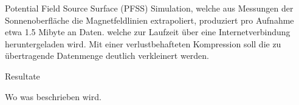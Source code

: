 Potential Field Source Surface (PFSS) Simulation, welche aus Messungen der Sonnenoberfläche die Magnetfeldlinien extrapoliert, produziert pro Aufnahme etwa 1.5 Mibyte an Daten. welche zur Laufzeit über eine Internetverbindung heruntergeladen wird. Mit einer verlustbehafteten Kompression soll die zu übertragende Datenmenge deutlich verkleinert werden.

Resultate

Wo was beschrieben wird.




 